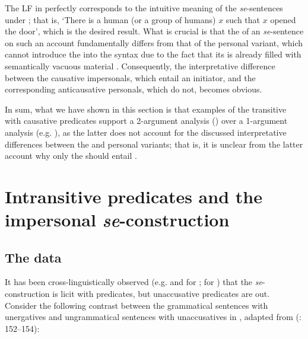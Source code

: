 \documentclass[output=paper,nonflat,newtxmath]{langsci/langscibook}
\begin{document}
\noindent The LF in  perfectly corresponds to the intuitive meaning of the  \textit{se}-sentences under ; that is, `There is a human (or a group of humans) $x$ such that $x$ opened the door', which is the desired result. What is crucial is that the  of an  \textit{se}-sentence on such an account fundamentally differs from that of the personal variant, which cannot introduce the  into the syntax due to the fact that its   is already filled with semantically vacuous material . Consequently, the interpretative difference between the causative impersonals, which entail an initiator, and the corresponding anticausative personals, which do not, becomes obvious.

In sum, what we have shown in this section is that examples of the transitive  with causative predicates support a 2-argument analysis (\citealt{riverosheppard2003}) over a 1-argument analysis (e.g. \citealt{marelj2004,grahek2008}), as the latter does not account for the discussed interpretative differences between the  and personal variants; that is, it is unclear from the latter account why only the  should entail .

\section{Intransitive predicates and the impersonal \textit{se}-construction} \label{sec3}

\subsection{The data}

It has been cross-linguistically observed (e.g. \citealt{cinque1995} and \citealt{dalessandro2008} for ; \citealt{ilcmarvin2016} for ) that the  \textit{se}-construction is licit with  predicates, but unaccusative predicates are out. Consider the following contrast between the grammatical sentences with unergatives  and ungrammatical sentences with unaccusatives  in , adapted from \citeauthor{ilcmarvin2016} (\citeyear{ilcmarvin2016}: 152–154):
\end{document}
